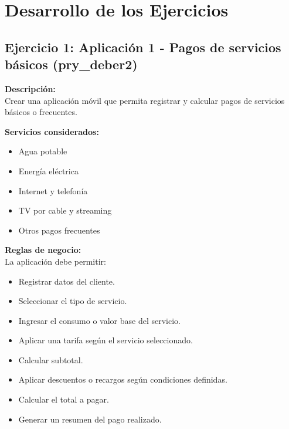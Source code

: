 \documentclass[12pt, a4paper]{article}
\begin{document}
\section{Desarrollo de los Ejercicios}

\subsection{Ejercicio 1: Aplicación 1 - Pagos de servicios básicos (pry\_deber2)}
\textbf{Descripción:}\\
Crear una aplicación móvil que permita registrar y calcular pagos de servicios básicos o frecuentes.

\textbf{Servicios considerados:}
\begin{itemize}
    \item Agua potable
    \item Energía eléctrica
    \item Internet y telefonía
    \item TV por cable y streaming
    \item Otros pagos frecuentes
\end{itemize}

\textbf{Reglas de negocio:}\\
La aplicación debe permitir:
\begin{itemize}
    \item Registrar datos del cliente.
    \item Seleccionar el tipo de servicio.
    \item Ingresar el consumo o valor base del servicio.
    \item Aplicar una tarifa según el servicio seleccionado.
    \item Calcular subtotal.
    \item Aplicar descuentos o recargos según condiciones definidas.
    \item Calcular el total a pagar.
    \item Generar un resumen del pago realizado.
\end{itemize}
\end{document}

